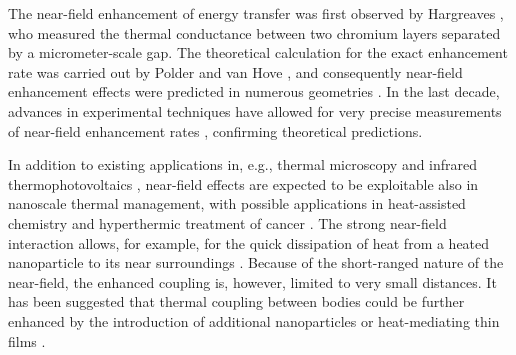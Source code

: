 The near-field enhancement of energy transfer was first observed by Hargreaves \cite{hargreaves69}, who measured the thermal conductance between two chromium layers separated by a micrometer-scale gap. The theoretical calculation for the exact enhancement rate was carried out by Polder and van Hove \cite{polder71}, and consequently near-field enhancement effects were predicted in numerous geometries \cite{loomis94,pendry99,carminati99,shchegrov00,mulet01,volokitin01}. In the last decade, advances in experimental techniques have allowed for very precise measurements of near-field enhancement rates \cite{kittel05,hu08,shen09,ottens11}, confirming theoretical predictions. 

In addition to existing applications in, e.g., thermal microscopy \cite{majumdar99,muller-hirsch99,kittel05,kittel08} and infrared thermophotovoltaics \cite{dimatteo01,narayanaswamy03,laroche06}, near-field effects are expected to be exploitable also in nanoscale thermal management, with possible applications in heat-assisted chemistry \cite{cao07,adleman09} and hyperthermic treatment of cancer \cite{vanderzee02}. The strong near-field interaction allows, for example, for the quick dissipation of heat from a heated nanoparticle to its near surroundings \cite{mulet01,domingues05}. Because of the short-ranged nature of the near-field, the enhanced coupling is, however, limited to very small distances. It has been suggested that thermal coupling between bodies could be further enhanced by the introduction of additional nanoparticles  \cite{benabdallah11,messina13} or heat-mediating thin films \cite{zheng11,messina12}. 






